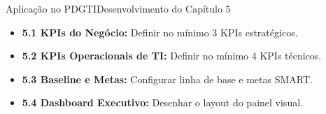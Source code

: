 \begin{senaiframe}{Aplicação no PDGTI}{Desenvolvimento do Capítulo 5}
  \vspace{0.2cm}
  \begin{tcolorbox}[senaigreencard, title={Capítulo 5 – Gestão de Desempenho e Indicadores}]
    \begin{itemize}
      \item \textbf{5.1 KPIs do Negócio:} Definir no mínimo 3 KPIs estratégicos.
      \item \textbf{5.2 KPIs Operacionais de TI:} Definir no mínimo 4 KPIs técnicos.
      \item \textbf{5.3 Baseline e Metas:} Configurar linha de base e metas SMART.
      \item \textbf{5.4 Dashboard Executivo:} Desenhar o layout do painel visual.
    \end{itemize}
  \end{tcolorbox}
\end{senaiframe}
